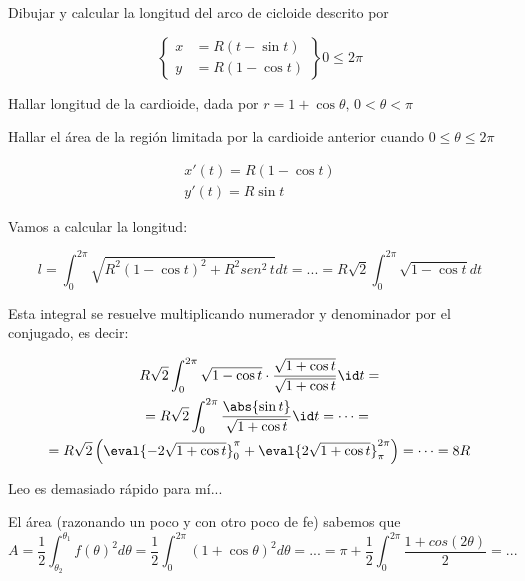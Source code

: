 \begin{problem}[3]
\ppart Dibujar y calcular la longitud del arco de cicloide descrito por

\[\left\{\begin{array}{cc}
x&=R(t-\sin t)\\
y&=R(1-\cos t)
\end{array}\right\}  0\leq2\pi\]

\ppart Hallar longitud de la cardioide, dada por $r = 1+\cos\theta,\,0<\theta<\pi$

\ppart Hallar el área de la región limitada por la cardioide anterior cuando $0\leq\theta\leq2\pi$

\solution

\spart

\begin{gather*}
x'(t) = R(1-\cos t)\\
y'(t) = R\sin t
\end{gather*}

Vamos a calcular la longitud:

\[l = \int_0^{2\pi}\sqrt{R^2(1-\cos t)^2 + R^2sen^2\,t}dt = ... = R\sqrt{2}\int_0^{2\pi} \sqrt{1-\cos t}dt\]

Esta integral se resuelve multiplicando numerador y denominador por el conjugado, es decir:

\begin{gather*}
R\sqrt{2}\int_0^{2\pi} \sqrt{1-\cos t}\cdot\frac{\sqrt{1+\cos t}}{\sqrt{1+\cos t}}\id t = \\
 = R\sqrt{2}\int_0^{2\pi} \frac{\abs{\sin t}}{\sqrt{1+\cos t}} \id t = \dotsb = \\
 = R\sqrt{2} \left(\eval{-2\sqrt{1+\cos t}}_0^{\pi} + \eval{2\sqrt{1+\cos t}}_{\pi}^{2\pi}\right) = \dotsb = 8R
\end{gather*}

\spart Leo es demasiado rápido para mí...

\spart
El área (razonando un poco y con otro poco de fe) sabemos que
 \[A = \frac{1}{2} \int_{\theta_2}^{\theta_1}f(\theta)^2d\theta =
\frac{1}{2} \int_{0}^{2\pi}(1+\cos \theta)^2d\theta = ... = \pi + \frac{1}{2}\int_0^{2\pi}\frac{1+cos(2\theta)}{2} = ... \]
\end{problem}


